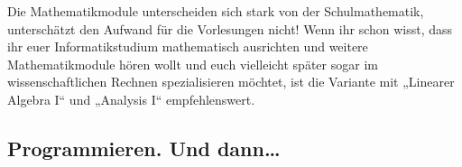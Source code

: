 Die Mathematikmodule unterscheiden sich stark von der Schulmathematik, unterschätzt den Aufwand für die Vorlesungen nicht! Wenn ihr schon wisst, dass ihr euer Informatikstudium mathematisch ausrichten und weitere Mathematikmodule hören wollt und euch vielleicht später sogar im wissenschaftlichen Rechnen spezialisieren möchtet, ist die Variante mit „Linearer Algebra I“ und „Analysis I“ empfehlenswert.

\subsection{Programmieren. Und dann\dots}


